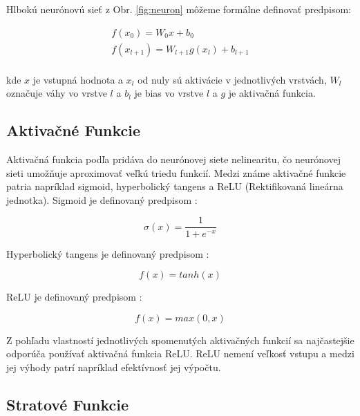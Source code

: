 Hlbokú neurónovú sieť z Obr. \ref{fig:neuron} môžeme formálne definovať predpisom:

\begin{equation}
\begin{split}
  f(x_0) = W_0 x + b_0 \\
  f(x_{l+1}) = W_{l+1} g(x_l) + b_{l+1} \\  
\end{split}
\end{equation}

kde $x$ je vstupná hodnota a $x_l$ od nuly sú aktivácie v jednotlivých vrstvách, $W_l$ označuje váhy vo vrstve $l$ a $b_l$ je bias vo vrstve $l$ a $g$ je aktivačná funkcia.

\subsection{Aktivačné Funkcie} \label{sec:aktivacne_funkcie}

Aktivačná funkcia podľa \cite{Goodfellow-et-al-2016} pridáva do neurónovej siete nelinearitu, čo neurónovej sieti umožňuje aproximovať veľkú triedu funkcií. Medzi známe aktivačné funkcie patria napríklad sigmoid, hyperbolický tangens a ReLU (Rektifikovaná lineárna jednotka). Sigmoid je definovaný predpisom \cite{Goodfellow-et-al-2016}:

\begin{equation}
\sigma(x) = \frac{1}{1 + e^{-x}}
\end{equation}

Hyperbolický tangens je definovaný predpisom \cite{Goodfellow-et-al-2016}:

\begin{equation}
f(x) = tanh(x)
\end{equation}

ReLU je definovaný predpisom \cite{Goodfellow-et-al-2016}:

\begin{equation}
f(x) = max(0, x)
\end{equation}

Z pohľadu vlastností jednotlivých spomenutých aktivačných funkcií sa najčastejšie odporúča používať aktivačná funkcia ReLU. ReLU nemení veľkosť vstupu a medzi jej výhody patrí napríklad efektívnosť jej výpočtu.

\subsection{Stratové Funkcie} \label{sec:stratove_funkcie}

